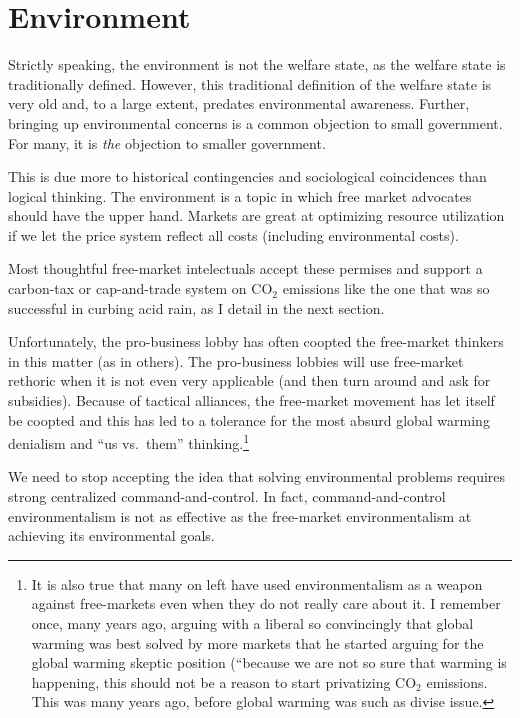 \chapter{Environment}
\label{chpt:environment}

Strictly speaking, the environment is not the welfare state, as the welfare
state is traditionally defined. However, this traditional definition of the
welfare state is very old and, to a large extent, predates environmental
awareness. Further, bringing up environmental concerns is a common objection to
small government. For many, it is \emph{the} objection to smaller government.

This is due more to historical contingencies and sociological coincidences than
logical thinking. The environment is a topic in which free market advocates
should have the upper hand. Markets are great at optimizing resource
utilization if we let the price system reflect all costs (including
environmental costs).

Most thoughtful free-market intelectuals accept these permises and support a
carbon-tax or cap-and-trade system on CO$_2$ emissions like the one that was so
successful in curbing acid rain, as I detail in the next section.

Unfortunately, the pro-business lobby has often coopted the free-market
thinkers in this matter (as in others). The pro-business lobbies will use
free-market rethoric when it is not even very applicable (and then turn around
and ask for subsidies). Because of tactical alliances, the free-market movement
has let itself be coopted and this has led to a tolerance for the most absurd
global warming denialism and ``us vs.\ them'' thinking.\footnote{It is also
true that many on left have used environmentalism as a weapon against
free-markets even when they do not really care about it. I remember once, many
years ago, arguing with a liberal so convincingly that global warming was best
solved by more markets that he started arguing for the global warming skeptic
position (``because we are not so sure that warming is happening, this should
not be a reason to start privatizing CO${}_2$ emissions. This was many years
ago, before global warming was such as divise issue.}

We need to stop accepting the idea that solving environmental problems requires
strong centralized command-and-control. In fact, command-and-control
environmentalism is not as effective as the free-market environmentalism at
achieving its environmental goals.

